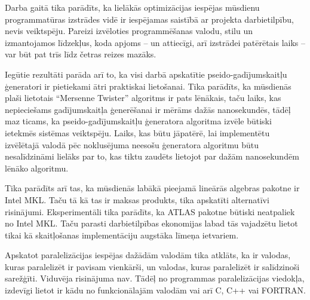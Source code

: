 \documentclass{ludis}
\begin{document}
Darba gaitā tika parādīts, ka lielākās optimizācijas iespējas mūsdienu programmatūras izstrādes vidē ir iespējamas saistībā ar projekta darbietilpību, nevis veiktspēju. Pareizi izvēloties programmēšanas valodu, stilu un izmantojamos līdzekļus, koda apjoms -- un attiecīgi, arī izstrādei patērētais laiks -- var būt pat trīs līdz četras reizes mazāks.

Iegūtie rezultāti parāda arī to, ka visi darbā apskatītie pseido-gadījumskaitļu ģeneratori ir pietiekami ātri praktiskai lietošanai. Tika parādīts, ka mūsdienās plaši lietotais ``Mersenne Twister'' algoritms ir pats lēnākais, taču laiks, kas nepieciešams gadījumskaitļa ģenerēšanai ir mērāms dažās nanosekundēs, tādēļ maz ticams, ka pseido-gadījumskaitļu ģeneratora algoritma izvēle būtiski ietekmēs sistēmas veiktspēju. Laiks, kas būtu jāpatērē, lai implementētu izvēlētajā valodā pēc noklusējuma neesošu ģeneratora algoritmu būtu nesalīdzināmi lielāks par to, kas tiktu zaudēts lietojot par dažām nanosekundēm lēnāko algoritmu.

Tika parādīts arī tas, ka mūsdienās labākā pieejamā lineārās algebras pakotne ir Intel MKL. Taču tā kā tas ir maksas produkts, tika apskatīti alternatīvi risinājumi. Eksperimentāli tika parādīts, ka ATLAS pakotne būtiski neatpaliek no Intel MKL. Taču parasti darbietilpības ekonomijas labad tās vajadzētu lietot tikai kā skaitļošanas implementāciju augstāka līmeņa ietvariem.

Apskatot paralelizācijas iespējas dažādām valodām tika atklāts, ka ir valodas, kuras paralelizēt ir pavisam vienkārši, un valodas, kuras paralelizēt ir salīdzinoši sarežģīti. Viduvēja risinājuma nav. Tādēļ no programmas paralelizācijas viedokļa, izdevīgi lietot ir kādu no funkcionālajām valodām vai arī C, C++ vai FORTRAN.


\end{document}

